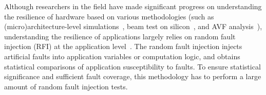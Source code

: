 Although researchers in the field have made significant progress on understanding the resilience of hardware based on various methodologies 
(such as (micro)architecture-level simulations~\cite{asplos10:feng, hpca09:li}, beam test on silicon~\cite{aspdac14:cher, sc14:cher}, 
and AVF analysis~\cite{isca05:mukherjee, micro03:mukherjee}),
understanding the resilience of applications largely relies on random fault injection (RFI) at the application level~\cite{europar14:calhoun, mg_ics12, bifit:sc12, sc16_gpu_fault_injection, prdc13:sharma}.  
The random fault injection injects artificial faults into application variables or computation logic,
and obtains statistical comparisons %
of application susceptibility to faults.
To ensure statistical significance and sufficient fault coverage,
this methodology has to perform a large amount of random fault injection
tests. 
 
